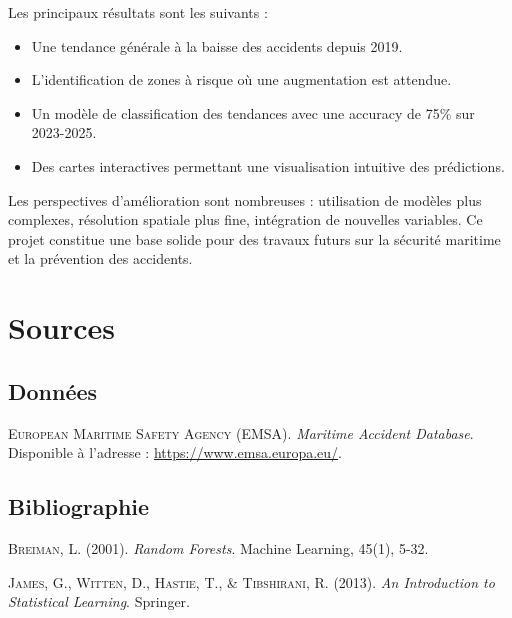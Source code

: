 \documentclass[12pt, a4paper]{report}
\begin{document}
Les principaux résultats sont les suivants :

\begin{itemize}
    \item Une tendance générale à la baisse des accidents depuis 2019.
    \item L'identification de zones à risque où une augmentation est attendue.
    \item Un modèle de classification des tendances avec une accuracy de 75\% sur 2023-2025.
    \item Des cartes interactives permettant une visualisation intuitive des prédictions.
\end{itemize}

Les perspectives d'amélioration sont nombreuses : utilisation de modèles plus complexes, résolution spatiale plus fine, intégration de nouvelles variables. Ce projet constitue une base solide pour des travaux futurs sur la sécurité maritime et la prévention des accidents.

\chapter*{Sources}

\section*{Données}

\begingroup
\justifying
\sloppy

\begin{enumerate}[label={[1]}, leftmargin=2cm]
\item \textsc{European Maritime Safety Agency (EMSA)}. \textit{Maritime Accident Database}. Disponible à l'adresse : \url{https://www.emsa.europa.eu/}.
\end{enumerate}

\section*{Bibliographie}

\begin{enumerate}[label={[2]}, leftmargin=2cm, start=2]
\item \textsc{Breiman, L.} (2001). \textit{Random Forests}. Machine Learning, 45(1), 5-32.
\item \textsc{James, G., Witten, D., Hastie, T., \& Tibshirani, R.} (2013). \textit{An Introduction to Statistical Learning}. Springer.
\end{enumerate}
\end{document}
